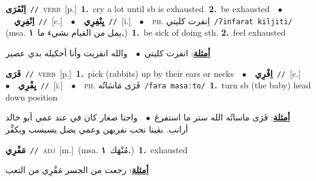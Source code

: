 \documentclass[10pt,a4paper,twoside]{article} %
\begin{document}
\begin{multicols}{2}
{\setlength\topsep{0pt}\textbf{\foreignlanguage{arabic}{اِنْفَرَى}}\ {\color{gray}\texttt{//}\color{black}}\ \textsc{verb}\ [p.]\ \textbf{1.}~cry a lot until sb is exhausted.  \textbf{2.}~be exhausted\ \ $\bullet$\ \ \setlength\topsep{0pt}\textbf{\foreignlanguage{arabic}{اِنْفِرِي}}\ {\color{gray}\texttt{//}\color{black}}\ [c.]\ \ $\bullet$\ \ \setlength\topsep{0pt}\textbf{\foreignlanguage{arabic}{يِنْفِرِي}}\ {\color{gray}\texttt{//}\color{black}}\ [i.]\ \ $\bullet$\ \ \textsc{ph.} \color{gray} \foreignlanguage{arabic}{اِنفرت كليتي}\color{black}\ {\color{gray}\texttt{/{\sffamily ʔinfarat kiljiti}/}\color{black}}\ \color{gray} (msa. \foreignlanguage{arabic}{يمل من القيام بشيء ما}~\foreignlanguage{arabic}{\textbf{١.}})\color{black}\ \textbf{1.}~be sick of doing sth.  \textbf{2.}~feel exhausted\  \begin{flushright}\color{gray}\foreignlanguage{arabic}{\textbf{\underline{\foreignlanguage{arabic}{أمثلة}}}: انفرت كليتي\ $\bullet$\ \  والله انفريت وأنا أحكيله بدي عصير}\end{flushright}\color{black}} \vspace{2mm}

{\setlength\topsep{0pt}\textbf{\foreignlanguage{arabic}{فَرَى}}\ {\color{gray}\texttt{//}\color{black}}\ \textsc{verb}\ [p.]\ \textbf{1.}~pick (rabbits) up by their ears or necks\ \ $\bullet$\ \ \setlength\topsep{0pt}\textbf{\foreignlanguage{arabic}{اِفْرِي}}\ {\color{gray}\texttt{//}\color{black}}\ [c.]\ \ $\bullet$\ \ \setlength\topsep{0pt}\textbf{\foreignlanguage{arabic}{يِفْرِي}}\ {\color{gray}\texttt{//}\color{black}}\ [i.]\ \ $\bullet$\ \ \textsc{ph.} \color{gray} \foreignlanguage{arabic}{فَرَى مَاسَاتُه}\color{black}\ {\color{gray}\texttt{/{\sffamily fara masaːto}/}\color{black}}\ \textbf{1.}~turn sb (the baby) head down position\  \begin{flushright}\color{gray}\foreignlanguage{arabic}{\textbf{\underline{\foreignlanguage{arabic}{أمثلة}}}: فَرَى ماساتُه الله ستر ما استفرغ\ $\bullet$\ \  واحنا صغار كان في عند عمي أبو خالد أرانب. بقينا نحب نفريهن وعمي يضل يسبسب ويكفِّر}\end{flushright}\color{black}} \vspace{2mm}

{\setlength\topsep{0pt}\textbf{\foreignlanguage{arabic}{مَفْرِي}}\ {\color{gray}\texttt{//}\color{black}}\ \textsc{adj}\ [m.]\ \color{gray}(msa. \foreignlanguage{arabic}{مُنْهَك}~\foreignlanguage{arabic}{\textbf{١.}})\color{black}\ \textbf{1.}~exhausted\  \begin{flushright}\color{gray}\foreignlanguage{arabic}{\textbf{\underline{\foreignlanguage{arabic}{أمثلة}}}: رجعت من الجسر مَفْرِي من التعب}\end{flushright}\color{black}} \vspace{2mm}


\end{multicols}
\end{document}
